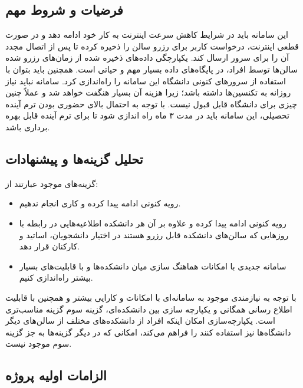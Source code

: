 \subsection*{
فرضیات و شروط مهم
} 

این سامانه باید در شرایط کاهش سرعت اینترنت به کار خود ادامه دهد و در صورت قطعی اینترنت، درخواست کاربر برای رزرو سالن را ذخیره کرده تا پس از اتصال مجدد آن را برای سرور ارسال کند. یکپارچگی داده‌های ذخیره شده از زمان‌های رزرو شده سالن‌ها توسط افراد، در پایگاه‌های داده بسیار مهم و حیاتی است. همچنین باید بتوان با استفاده از سرورهای کنونی دانشگاه این سامانه را راه‌اندازی کرد. سامانه نباید نیاز روزانه به تکنسین‌ها داشته باشد؛ زیرا هزینه‌ آن بسیار هنگفت خواهد شد و عملاً چنین چیزی برای دانشگاه قابل قبول نیست. با توجه به احتمال بالای حضوری بودن ترم آینده تحصیلی، این سامانه باید در مدت ۳ ماه راه اندازی شود تا برای ترم آینده قابل بهره برداری باشد.


\subsection*{
تحلیل گزینه‌ها و پیشنهادات
}

گزینه‌های موجود عبارتند از:
\begin{itemize}
	\item {
 رویه کنونی ادامه پیدا کرده و کاری انجام ندهیم.	
	}
	\item  {
 رویه کنونی ادامه پیدا کرده و علاوه‌ بر آن هر دانشکده اطلاعیه‌هایی در رابطه با روز‌هایی که سالن‌های دانشکده قابل رزرو هستند در اختیار دانشجویان، اساتید و کارکنان قرار دهد.	
	}
	\item {
سامانه جدیدی با امکانات هماهنگ سازی میان دانشکده‌ها و با قابلیت‌های بسیار بیشتر راه‌اندازی کنیم.
	}
\end{itemize}

با توجه به نیازمندی موجود به سامانه‌ای با امکانات و کارایی بیشتر و همچنین با قابلیت اطلاع رسانی همگانی و یکپارچه سازی بین دانشکده‌ای، گزینه سوم گزینه مناسب‌تری است. یکپارچه‌سازی امکان اینکه افراد از دانشکده‌های مختلف از سالن‌های دیگر دانشگاه‌ها نیز استفاده کنند را فراهم می‌کند، امکانی که در دیگر گزینه‌ها به جز گزینه سوم موجود نیست.


\subsection*{
الزامات اولیه پروژه
}

